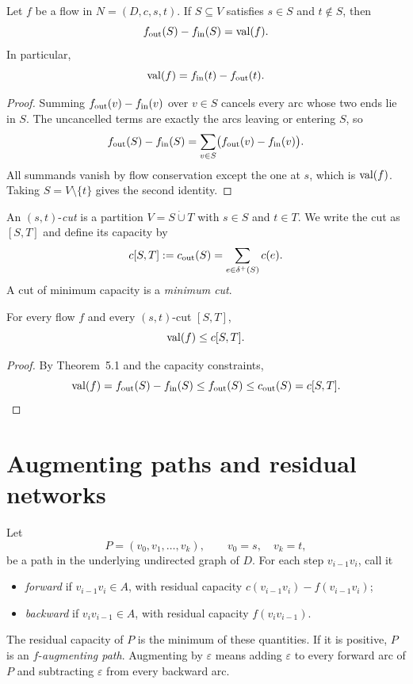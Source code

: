 \begin{notetheorem}
Let $f$ be a flow in $N=(D,c,s,t)$.  If $S\subseteq V$ satisfies
$s\in S$ and $t\notin S$, then
\[
  f_{\operatorname{out}}(S)-f_{\operatorname{in}}(S)=\operatorname{val}(f).
\]
In particular,
\[
  \operatorname{val}(f)=f_{\operatorname{in}}(t)-f_{\operatorname{out}}(t).
\]
\end{notetheorem}
\begin{proof}
Summing $f_{\operatorname{out}}(v)-f_{\operatorname{in}}(v)$ over $v\in S$ cancels every arc whose
two ends lie in $S$.  The uncancelled terms are exactly the arcs leaving or
entering $S$, so
\[
  f_{\operatorname{out}}(S)-f_{\operatorname{in}}(S)
  =\sum_{v\in S}\bigl(f_{\operatorname{out}}(v)-f_{\operatorname{in}}(v)\bigr).
\]
All summands vanish by flow conservation except the one at $s$, which is
$\operatorname{val}(f)$.  Taking $S=V\setminus\{t\}$ gives the second identity.
\end{proof}
\begin{notedefinition}
An $(s,t)$-\emph{cut} is a partition $V=S\dot\cup T$ with $s\in S$ and
$t\in T$.  We write the cut as $[S,T]$ and define its capacity by
\[
  c[S,T]:=c_{\operatorname{out}}(S)=\sum_{e\in\delta^+(S)}c(e).
\]
A cut of minimum capacity is a \emph{minimum cut}.
\end{notedefinition}

\begin{notetheorem}
For every flow $f$ and every $(s,t)$-cut $[S,T]$,
\[
  \operatorname{val}(f)\le c[S,T].
\]
\end{notetheorem}
\begin{proof}
By Theorem~5.1 and the capacity constraints,
\[
  \operatorname{val}(f)=f_{\operatorname{out}}(S)-f_{\operatorname{in}}(S)
  \le f_{\operatorname{out}}(S)
  \le c_{\operatorname{out}}(S)=c[S,T].
\]
\end{proof}
\section{Augmenting paths and residual networks}

\begin{notedefinition}
Let
\[
  P=(v_0,v_1,\dots,v_k),\qquad v_0=s,\quad v_k=t,
\]
be a path in the underlying undirected graph of $D$.  For each step
$v_{i-1}v_i$, call it
\begin{itemize}
  \item \emph{forward} if $v_{i-1}v_i\in A$, with residual capacity
        $c(v_{i-1}v_i)-f(v_{i-1}v_i)$;
  \item \emph{backward} if $v_iv_{i-1}\in A$, with residual capacity
        $f(v_iv_{i-1})$.
\end{itemize}
The residual capacity of $P$ is the minimum of these quantities.  If it is
positive, $P$ is an $f$-\emph{augmenting path}.  Augmenting by $\varepsilon$
means adding $\varepsilon$ to every forward arc of $P$ and subtracting
$\varepsilon$ from every backward arc.
\end{notedefinition}

